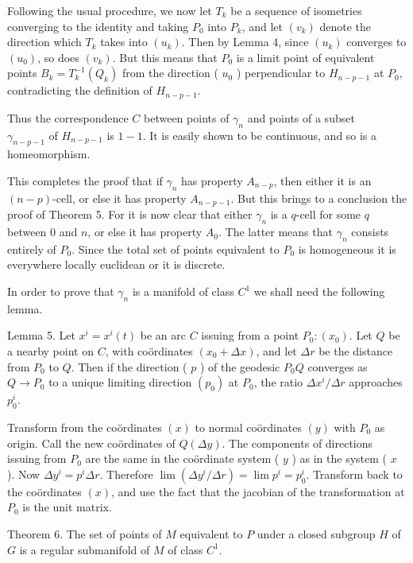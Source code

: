 \documentclass[10pt]{article}
\begin{document}
Following the usual procedure, we now let $T_{k}$ be a sequence of isometries converging to the identity and taking $P_{0}$ into $P_{k}$, and let $\left(v_{k}\right)$ denote the direction which $T_{k}$ takes into $\left(u_{k}\right)$. Then by Lemma 4, since $\left(u_{k}\right)$ converges to $\left(u_{0}\right)$, so does $\left(v_{k}\right)$. But this means that $P_{0}$ is a limit point of equivalent points $B_{k}=T_{k}^{-1}\left(Q_{k}\right)$ from the direction ( $u_{0}$ ) perpendicular to $H_{n-p-1}$ at $P_{0}$, contradicting the definition of $H_{n-p-1}$.

Thus the correspondence $C$ between points of $\gamma_{n}$ and points of a subset\\
$\gamma_{n-p-1}$ of $H_{n-p-1}$ is $1-1$. It is easily shown to be continuous, and so is a homeomorphism.

This completes the proof that if $\gamma_{n}$ has property $A_{n-p}$, then either it is an $(n-p)$-cell, or else it has property $A_{n-p-1}$. But this brings to a conclusion the proof of Theorem 5. For it is now clear that either $\gamma_{n}$ is a $q$-cell for some $q$ between 0 and $n$, or else it has property $A_{0}$. The latter means that $\gamma_{n}$ consists entirely of $P_{0}$. Since the total set of points equivalent to $P_{0}$ is homogeneous it is everywhere locally euclidean or it is discrete.

In order to prove that $\gamma_{n}$ is a manifold of class $C^{1}$ we shall need the following lemma.

Lemma 5. Let $x^{i}=x^{i}(t)$ be an arc $C$ issuing from a point $P_{0}:\left(x_{0}\right)$. Let $Q$ be a nearby point on $C$, with coördinates $\left(x_{0}+\Delta x\right)$, and let $\Delta r$ be the distance from $P_{0}$ to $Q$. Then if the direction ( $p$ ) of the geodesic $P_{0} Q$ converges as $Q \rightarrow P_{0}$ to a unique limiting direction $\left(p_{0}\right)$ at $P_{0}$, the ratio $\Delta x^{i} / \Delta r$ approaches $p_{0}^{i}$.

Transform from the coördinates $(x)$ to normal coördinates $(y)$ with $P_{0}$ as origin. Call the new coördinates of $Q(\Delta y)$. The components of directions issuing from $P_{0}$ are the same in the coördinate system ( $y$ ) as in the system ( $x$ ). Now $\Delta y^{i}=p^{i} \Delta r$. Therefore $\lim \left(\Delta y^{i} / \Delta r\right)=\lim p^{i}=p_{0}^{i}$. Transform back to the coördinates $(x)$, and use the fact that the jacobian of the transformation at $P_{0}$ is the unit matrix.

Theorem 6. The set of points of $M$ equivalent to $P$ under a closed subgroup $H$ of $G$ is a regular submanifold of $M$ of class $C^{1}$.
\end{document}
